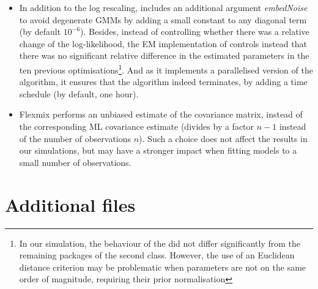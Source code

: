 \begin{itemize}
\item
  In addition to the log rescaling,  includes an additional argument \emph{embedNoise} to avoid degenerate GMMs by adding a small constant to any diagonal term (by default \(10^{-6}\)). Besides, instead of controlling whether there was a relative change of the log-likelihood, the EM implementation of  controls instead that there was no significant relative difference in the estimated parameters in the ten previous optimisations\footnote{In our simulation, the behaviour of the  did not differ significantly from the remaining packages of the second class.
    However, the use of an Euclidean distance criterion may be problematic when parameters are not on the same order of magnitude, requiring their prior normalisation}. And as it implements a parallelised version of the algorithm, it ensures that the algorithm indeed terminates, by adding a time schedule (by default, one hour).
\item
  Flexmix performs an unbiased estimate of the covariance matrix, instead of the corresponding ML covariance estimate (divides by a factor \(n-1\) instead of the number of observations \(n\)). Such a choice does not affect the results in our simulations, but may have a stronger impact when fitting models to a small number of observations.
\end{itemize}

\hypertarget{additional-files}{%
\section{Additional files}\label{additional-files}}

